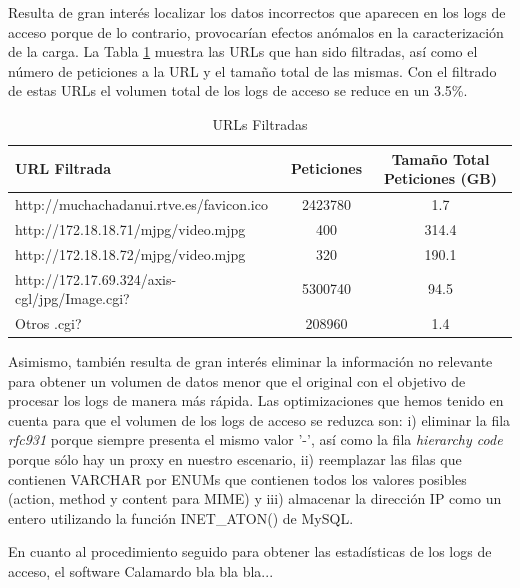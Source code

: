 \documentclass[twocolumn]{Jornadas}
\begin{document}
Resulta de gran interés localizar los datos incorrectos que aparecen en los logs de acceso porque de lo contrario, provocarían efectos anómalos en la caracterización de la carga.
La Tabla \ref{table:url} muestra las URLs que han sido filtradas, así como el número de peticiones a la URL y el tamaño total de las mismas.
Con el filtrado de estas URLs el volumen total de los logs de acceso se reduce en un 3.5\%.

\begin{table}[ht!]
\centering
\renewcommand{\baselinestretch}{1.5}
\scriptsize
\begin{tabular}{|l||c|c|} \hline
URL Filtrada                                  & Peticiones & Tamaño Total Peticiones (GB) \\\hline\hline
http://muchachadanui.rtve.es/favicon.ico      & 2423780    & 1.7                          \\\hline  
http://172.18.18.71/mjpg/video.mjpg           & 400        & 314.4                        \\\hline 
http://172.18.18.72/mjpg/video.mjpg           & 320        & 190.1                        \\\hline 
http://172.17.69.324/axis-cgl/jpg/Image.cgi?  & 5300740    & 94.5                         \\\hline 
Otros .cgi?                                   & 208960     & 1.4                          \\\hline 
\end{tabular}
\caption{URLs Filtradas}
\label{table:url}
\end{table}

Asimismo, también resulta de gran interés eliminar la información no relevante para obtener un volumen de datos menor que el original con el objetivo de procesar los logs de manera más rápida. Las optimizaciones que hemos tenido en cuenta para que el volumen de los logs de acceso se reduzca son: i) eliminar la fila \emph{rfc931} porque siempre presenta el mismo valor '-', así como la fila \emph{hierarchy code} porque sólo hay un proxy en nuestro escenario, ii) reemplazar las filas que contienen VARCHAR por ENUMs que contienen todos los valores posibles (action, method y content para MIME) y iii) almacenar la dirección IP como un entero utilizando la función INET\_ATON() de MySQL.

En cuanto al procedimiento seguido para obtener las estadísticas de los logs de acceso, el software Calamardo bla bla bla...
\end{document}
